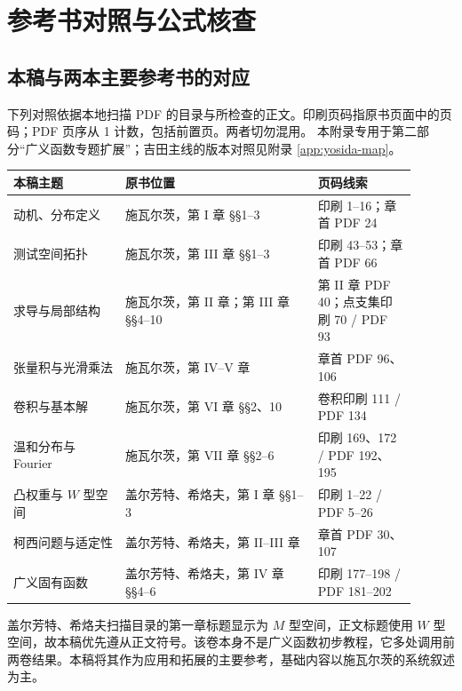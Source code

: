 \chapter{参考书对照与公式核查}\label{app:references}
\section{本稿与两本主要参考书的对应}
下列对照依据本地扫描 PDF 的目录与所检查的正文。印刷页码指原书页面中的页码；PDF 页序从 1 计数，包括前置页。两者切勿混用。
本附录专用于第二部分“广义函数专题扩展”；吉田主线的版本对照见附录 \ref{app:yosida-map}。

\begin{center}\small
\begin{tabular}{p{0.25\linewidth}p{0.43\linewidth}p{0.22\linewidth}}
\toprule
本稿主题 & 原书位置 & 页码线索\\\midrule
动机、分布定义 & 施瓦尔茨，第 I 章 §§1--3 & 印刷 1--16；章首 PDF 24\\
测试空间拓扑 & 施瓦尔茨，第 III 章 §§1--3 & 印刷 43--53；章首 PDF 66\\
求导与局部结构 & 施瓦尔茨，第 II 章；第 III 章 §§4--10 & 第 II 章 PDF 40；点支集印刷 70 / PDF 93\\
张量积与光滑乘法 & 施瓦尔茨，第 IV--V 章 & 章首 PDF 96、106\\
卷积与基本解 & 施瓦尔茨，第 VI 章 §§2、10 & 卷积印刷 111 / PDF 134\\
温和分布与 Fourier & 施瓦尔茨，第 VII 章 §§2--6 & 印刷 169、172 / PDF 192、195\\
凸权重与 $W$ 型空间 & 盖尔芳特、希烙夫，第 I 章 §§1--3 & 印刷 1--22 / PDF 5--26\\
柯西问题与适定性 & 盖尔芳特、希烙夫，第 II--III 章 & 章首 PDF 30、107\\
广义固有函数 & 盖尔芳特、希烙夫，第 IV 章 §§4--6 & 印刷 177--198 / PDF 181--202\\
\bottomrule
\end{tabular}
\end{center}
盖尔芳特、希烙夫扫描目录的第一章标题显示为 $M$ 型空间，正文标题使用 $W$ 型空间，故本稿优先遵从正文符号。该卷本身不是广义函数初步教程，它多处调用前两卷结果。本稿将其作为应用和拓展的主要参考，基础内容以施瓦尔茨的系统叙述为主。

